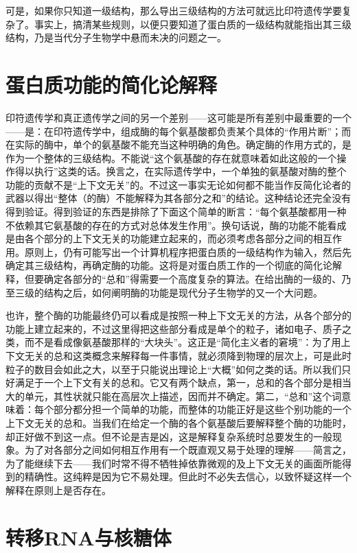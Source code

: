 可是，如果你只知道一级结构，那么导出三级结构的方法可就远比印符遗传学要复杂了。事实上，搞清某些规则，以便只要知道了蛋白质的一级结构就能指出其三级结构，乃是当代分子生物学中悬而未决的问题之一。

\section{蛋白质功能的简化论解释}

印符遗传学和真正遗传学之间的另一个差别——这可能是所有差别中最重要的一个——是：在印符遗传学中，组成酶的每个氨基酸都负责某个具体的“作用片断”；而在实际的酶中，单个的氨基酸不能充当这种明确的角色。确定酶的作用方式的，是作为一个整体的三级结构。不能说“这个氨基酸的存在就意味着如此这般的一个操作得以执行”这类的话。换言之，在实际遗传学中，一个单独的氨基酸对酶的整个功能的贡献不是“上下文无关”的。不过这一事实无论如何都不能当作反简化论者的武器以得出“整体（的酶）不能解释为其各部分之和”的结论。这种结论还完全没有得到验证。得到验证的东西是排除了下面这个简单的断言：“每个氨基酸都用一种不依赖其它氨基酸的存在的方式对总体发生作用”。换句话说，酶的功能不能看成是由各个部分的上下文无关的功能建立起来的，而必须考虑各部分之间的相互作用。原则上，仍有可能写出一个计算机程序把蛋白质的一级结构作为输入，然后先确定其三级结构，再确定酶的功能。这将是对蛋白质工作的一个彻底的简化论解释，但要确定各部分的“总和”得需要一个高度复杂的算法。在给出酶的一级的、乃至三级的结构之后，如何阐明酶的功能是现代分子生物学的又一个大问题。

也许，整个酶的功能最终仍可以看成是按照一种上下文无关的方法，从各个部分的功能上建立起来的，不过这里得把这些部分看成是单个的粒子，诸如电子、质子之类，而不是看成像氨基酸那样的“大块头”。这正是“简化主义者的窘境”：为了用上下文无关的总和这类概念来解释每一件事情，就必须降到物理的层次上，可是此时粒子的数目会如此之大，以至于只能说出理论上“大概”如何之类的话。所以我们只好满足于一个上下文有关的总和。它又有两个缺点，第一，总和的各个部分是相当大的单元，其性状就只能在高层次上描述，因而并不确定。第二，“总和”这个词意味着：每个部分都分担一个简单的功能，而整体的功能正好是这些个别功能的一个上下文无关的总和。当我们在给定一个酶的各个氨基酸后要解释整个酶的功能时，却正好做不到这一点。但不论是吉是凶，这是解释复杂系统时总要发生的一般现象。为了对各部分之间如何相互作用有一个既直观又易于处理的理解——简言之，为了能继续下去——我们时常不得不牺牲掉依靠微观的及上下文无关的画面所能得到的精确性。这纯粹是因为它不易处理。但此时不必失去信心，以致怀疑这样一个解释在原则上是否存在。

\section{转移RNA与核糖体}

